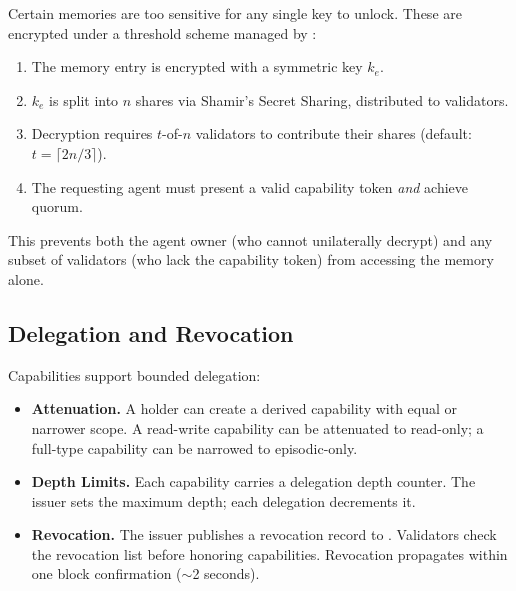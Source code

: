 Certain memories are too sensitive for any single key to unlock. These are encrypted under a threshold scheme managed by \TChain{}:

\begin{enumerate}
    \item The memory entry is encrypted with a symmetric key $k_e$.
    \item $k_e$ is split into $n$ shares via Shamir's Secret Sharing, distributed to \TChain{} validators.
    \item Decryption requires $t$-of-$n$ validators to contribute their shares (default: $t = \lceil 2n/3 \rceil$).
    \item The requesting agent must present a valid capability token \emph{and} achieve quorum.
\end{enumerate}

This prevents both the agent owner (who cannot unilaterally decrypt) and any subset of validators (who lack the capability token) from accessing the memory alone.

\subsection{Delegation and Revocation}

Capabilities support bounded delegation:

\begin{itemize}
    \item \textbf{Attenuation.} A holder can create a derived capability with equal or narrower scope. A read-write capability can be attenuated to read-only; a full-type capability can be narrowed to episodic-only.
    \item \textbf{Depth Limits.} Each capability carries a delegation depth counter. The issuer sets the maximum depth; each delegation decrements it.
    \item \textbf{Revocation.} The issuer publishes a revocation record to \IChain{}. Validators check the revocation list before honoring capabilities. Revocation propagates within one \IChain{} block confirmation ($\sim$2 seconds).
\end{itemize}

